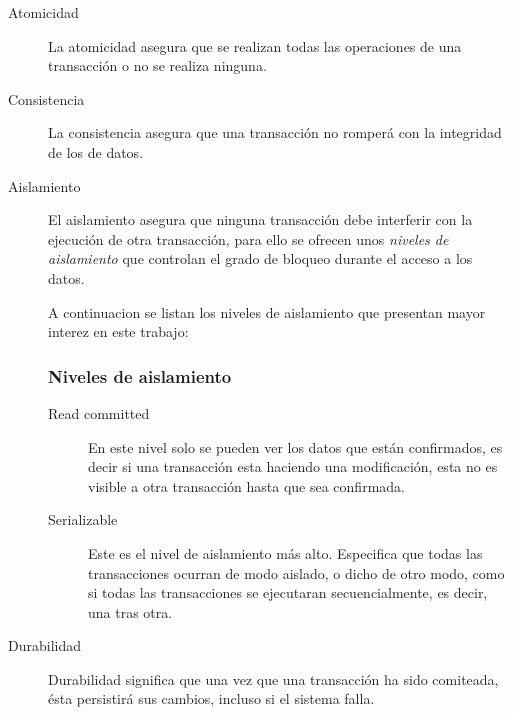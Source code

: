 	\begin{description}
	\item[Atomicidad]
		La atomicidad asegura que se realizan todas las operaciones de una transacción
		o no se realiza ninguna.
		
	\item[Consistencia]
		 La consistencia asegura que una transacción no romperá con la integridad de
		 los de datos.
	  
	\item[Aislamiento]	
		El aislamiento asegura que ninguna transacción debe interferir con la
		ejecución de otra transacción, para ello se ofrecen unos \emph{niveles
		de aislamiento} \cite{ANSI:1992:ANSd} que controlan el grado de bloqueo
		durante el acceso a los datos.
		
		\medskip

		A continuacion se listan los niveles de aislamiento que presentan mayor
		interez en este trabajo:
		
		\subsubsection{Niveles de aislamiento}
		\label{isolation}
	
		\begin{description}
			\item [Read committed]
				En este nivel solo se pueden ver los datos que están confirmados, es decir si
				una  transacción esta haciendo una modificación, esta no es visible a otra
				transacción hasta que sea confirmada.
				
		  \item [Serializable]
				Este es el nivel de aislamiento más alto. Especifica que todas las
				transacciones ocurran de modo aislado, o dicho de otro modo, como si todas las
				transacciones se ejecutaran secuencialmente, es decir, una tras otra. 
			\end{description}
			
	\item[Durabilidad]
		
		Durabilidad significa que una vez que una transacción ha sido comiteada, ésta
		persistirá sus cambios, incluso si el sistema falla.
	
	\end{description}
		
